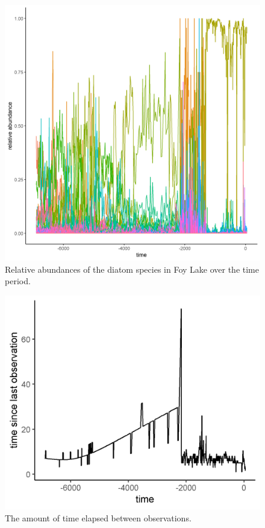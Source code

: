 \documentclass[12pt,twoside,openany]{reedthesis}
\begin{document}
\begin{figure}

{\centering \includegraphics[width=0.85\linewidth]{./chapterFiles/resampling/figsCalledInDiss/origDataRelAbundance} 

}

\caption{Relative abundances of the diatom species in Foy Lake over the time period.}\label{fig:origDat}
\end{figure}\begin{figure}
{\centering \includegraphics[width=0.85\linewidth]{./chapterFiles/resampling/figsCalledInDiss/timeElapsed} 

}

\caption{The amount of time elapsed between observations.}\label{fig:timeElapsed}
\end{figure}
\end{document}
